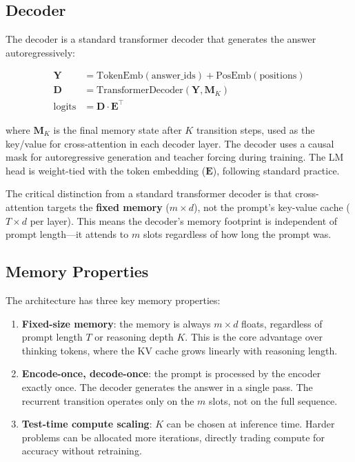 \documentclass[11pt,a4paper]{article}
\begin{document}
\subsection{Decoder}
\label{sec:decoder}

The decoder is a standard transformer decoder that generates the answer autoregressively:

\begin{align}
    \mathbf{Y} &= \text{TokenEmb}(\text{answer\_ids}) + \text{PosEmb}(\text{positions}) \\
    \mathbf{D} &= \text{TransformerDecoder}(\mathbf{Y}, \mathbf{M}_K) \\
    \text{logits} &= \mathbf{D} \cdot \mathbf{E}^\top
\end{align}

where $\mathbf{M}_K$ is the final memory state after $K$ transition steps, used as the key/value for cross-attention in each decoder layer. The decoder uses a causal mask for autoregressive generation and teacher forcing during training. The LM head is weight-tied with the token embedding ($\mathbf{E}$), following standard practice.

The critical distinction from a standard transformer decoder is that cross-attention targets the \textbf{fixed memory} ($m \times d$), not the prompt's key-value cache ($T \times d$ per layer). This means the decoder's memory footprint is independent of prompt length---it attends to $m$ slots regardless of how long the prompt was.

\subsection{Memory Properties}
\label{sec:memory-properties}

The architecture has three key memory properties:

\begin{enumerate}[nosep]
    \item \textbf{Fixed-size memory}: the memory is always $m \times d$ floats, regardless of prompt length $T$ or reasoning depth $K$. This is the core advantage over thinking tokens, where the KV cache grows linearly with reasoning length.
    \item \textbf{Encode-once, decode-once}: the prompt is processed by the encoder exactly once. The decoder generates the answer in a single pass. The recurrent transition operates only on the $m$ slots, not on the full sequence.
    \item \textbf{Test-time compute scaling}: $K$ can be chosen at inference time. Harder problems can be allocated more iterations, directly trading compute for accuracy without retraining.
\end{enumerate}
\end{document}
